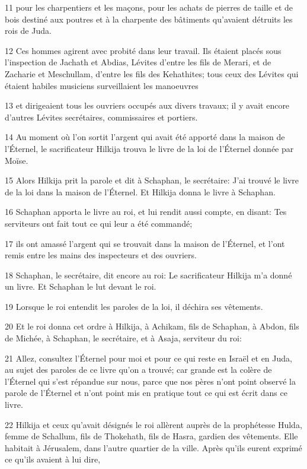 \par 11 pour les charpentiers et les maçons, pour les achats de pierres de taille et de bois destiné aux poutres et à la charpente des bâtiments qu'avaient détruits les rois de Juda.
\par 12 Ces hommes agirent avec probité dans leur travail. Ils étaient placés sous l'inspection de Jachath et Abdias, Lévites d'entre les fils de Merari, et de Zacharie et Meschullam, d'entre les fils des Kehathites; tous ceux des Lévites qui étaient habiles musiciens surveillaient les manoeuvres
\par 13 et dirigeaient tous les ouvriers occupés aux divers travaux; il y avait encore d'autres Lévites secrétaires, commissaires et portiers.
\par 14 Au moment où l'on sortit l'argent qui avait été apporté dans la maison de l'Éternel, le sacrificateur Hilkija trouva le livre de la loi de l'Éternel donnée par Moïse.
\par 15 Alors Hilkija prit la parole et dit à Schaphan, le secrétaire: J'ai trouvé le livre de la loi dans la maison de l'Éternel. Et Hilkija donna le livre à Schaphan.
\par 16 Schaphan apporta le livre au roi, et lui rendit aussi compte, en disant: Tes serviteurs ont fait tout ce qui leur a été commandé;
\par 17 ils ont amassé l'argent qui se trouvait dans la maison de l'Éternel, et l'ont remis entre les mains des inspecteurs et des ouvriers.
\par 18 Schaphan, le secrétaire, dit encore au roi: Le sacrificateur Hilkija m'a donné un livre. Et Schaphan le lut devant le roi.
\par 19 Lorsque le roi entendit les paroles de la loi, il déchira ses vêtements.
\par 20 Et le roi donna cet ordre à Hilkija, à Achikam, fils de Schaphan, à Abdon, fils de Michée, à Schaphan, le secrétaire, et à Asaja, serviteur du roi:
\par 21 Allez, consultez l'Éternel pour moi et pour ce qui reste en Israël et en Juda, au sujet des paroles de ce livre qu'on a trouvé; car grande est la colère de l'Éternel qui s'est répandue sur nous, parce que nos pères n'ont point observé la parole de l'Éternel et n'ont point mis en pratique tout ce qui est écrit dans ce livre.
\par 22 Hilkija et ceux qu'avait désignés le roi allèrent auprès de la prophétesse Hulda, femme de Schallum, fils de Thokehath, fils de Hasra, gardien des vêtements. Elle habitait à Jérusalem, dans l'autre quartier de la ville. Après qu'ils eurent exprimé ce qu'ils avaient à lui dire,
